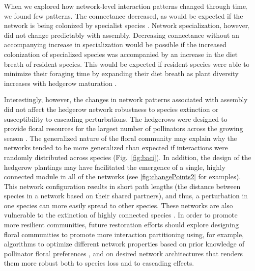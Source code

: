 \documentclass[12pt]{article}
\begin{document}
When we explored how network-level interaction patterns changed
through time, we found few patterns. The connectance decreased, as
would be expected if the network is being colonized by specialist
species \citep{mgonigle-2015-x}. Network specialization, however, did
not change predictably with assembly. Decreasing connectance without
an accompanying increase in specialization would be possible if the
increased colonization of specialized species was accompanied by an
increase in the diet breath of resident species. This would be
expected if resident species were able to minimize their foraging time
by expanding their diet breath as plant diversity increases with
hedgerow maturation \citep{pyke1984optimal, Waser1996, Bluthgen2007,
  albrecht2010plant}.

Interestingly, however, the changes in network patterns associated
with assembly did not affect the hedgerow network robustness to
species extinction or susceptibility to cascading perturbations. The
hedgerows were designed to provide floral resources for the largest
number of pollinators across the growing season
\citep{menz-2010-4}. The generalized nature of the floral community
may explain why the networks tended to be more generalized than
expected if interactions were randomly distributed across species
(Fig.~\ref{fig:baci}). In addition, the design of the hedgerow
plantings may have facilitated the emergence of a single, highly
connected module in all of the networks (see \ref{fig:changePoints2}
for examples). This network configuration results in short path
lengths (the distance between species in a network based on their
shared partners), and thus, a perturbation in one species can more
easily spread to other species. These networks are also vulnerable to
the extinction of highly connected species \citep{Burgos2007}. In
order to promote more resilient communities, future restoration
efforts should explore designing floral communities to promote more
interaction partitioning using, for example, algorithms to optimize
different network properties based on prior knowledge of pollinator
floral preferences \citep{mgonigle2016tool}, and on desired network
architectures that renders them more robust both to species loss and
to cascading effects.
\end{document}
